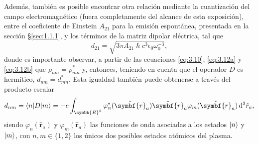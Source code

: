 Además, también es posible encontrar otra relación mediante la cuantización del campo electromagnético \autocite{Cohen-Tannoudji2019b} (fuera completamente del alcance de esta exposición), entre el coeficiente de Einstein $A_{21}$ para la emisión espontánea, presentada en la sección \S\ref{sec:1.1.1}, y los términos de la matriz dipolar eléctrica, tal que 
\begin{equation}\label{eq:3.13}
  d_{21} = \sqrt{3 \pi A_{21} \hslash c^{3} \epsilon_{0}\omega^{-3}_{0}}, 
\end{equation}
donde es importante observar, a partir de las ecuaciones \eqref{eq:3.10}, \eqref{eq:3.12a} y \eqref{eq:3.12b} que $\rho_{nm} = \rho^{*}_{mn}$ y, entonces, teniendo en cuenta que el operador $D$ es hermítico, $d_{nm} = d^{*}_{mn}$. Esta igualdad también puede obtenerse a través del producto escalar 
\begin{equation}\label{eq:3.14}
d_{nm} = \Xval{n}{D}{m} = -e \int_{\symbb{R}^{3}} \varphi^{*}_{n}(\hat{\symbf{r}}_{a}) \hat{\symbf{r}}_{a} \varphi_{m}(\hat{\symbf{r}}_{a}) \diff^{3}\hat{r}_{a},
\end{equation}
siendo $\varphi_{n}(\hat{\symbf{r}}_{a})$ y $\varphi_{m}(\hat{\symbf{r}}_{a})$ las funciones de onda asociadas a los estados $|n\rangle$ y $|m\rangle$, con $n, m \in \{1,2\}$ los únicos dos posibles estados atómicos del plasma. 

